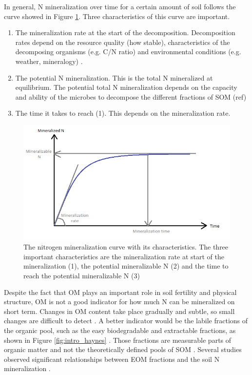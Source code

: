 \documentclass[10pt,twoside,dutch,english]{report}
\begin{document}
In general, N mineralization over time for a certain amount of soil  follows the curve showed in Figure \ref{fig:intro_Ncum}. Three characteristics of this curve are important. 
\begin{enumerate}
	\item The mineralization rate at the start of the decomposition. Decomposition rates depend on the resource quality (how stable), characteristics of the decomposing organisms (e.g. C/N ratio) and environmental conditions (e.g. weather, mineralogy) \citep{Lavelle1993}. 
	\item The potential N mineralization. This is the total N mineralized at equilibrium. The potential total N mineralization depends on the capacity and ability of the microbes to decompose the different fractions of SOM (ref)
	\item The time it takes to reach (1). This depends on the mineralization rate.
\end{enumerate}


\begin{figure}[h]
	\includegraphics[width=1\linewidth]{intro_Ncum}
	\caption{The nitrogen mineralization curve with its characteristics. The three important characteristics are the mineralization rate at start of the mineralization (1), the potential mineralizable N (2) and the time to reach the potential mineralizable N (3)}
	\label{fig:intro_Ncum}
\end{figure}

Despite the fact that OM plays an important role in soil fertility and physical structure, OM is not a good indicator for how much N can be mineralized on short term. Changes in OM content take place gradually and subtle, so small changes are difficult to detect \citep{Ghani2002, Hanegraaf2009}. A better indicator would be the labile fractions of the organic pool, such as the easy biodegradable and extractable fractions, as shown in Figure \ref{fig:intro_haynes} \citep{Haynes2005}. Those fractions are measurable parts of organic matter and not the theoretically defined pools of SOM \citep{Wander2004}. Several studies observed significant relationships between EOM fractions and the soil N mineralization \citep{Ros2011a,Ros2012}.  
\end{document}

